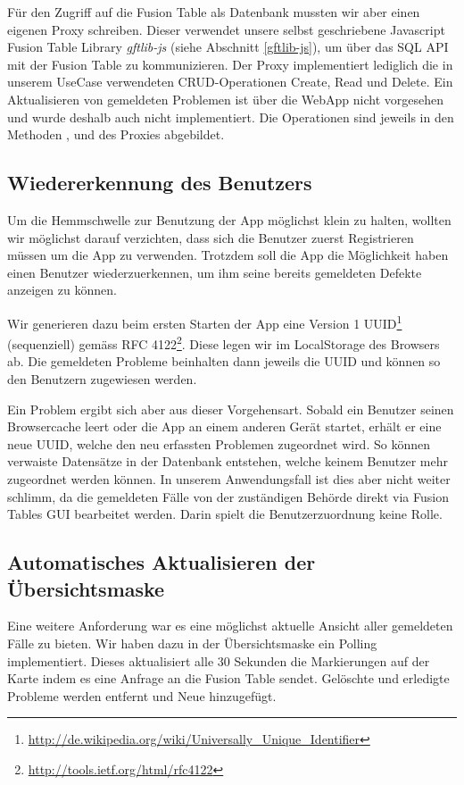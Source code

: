 Für den Zugriff auf die Fusion Table als Datenbank mussten wir aber einen eigenen Proxy schreiben. Dieser verwendet unsere selbst geschriebene Javascript Fusion Table Library \emph{gftlib-js} (siehe Abschnitt \ref{gftlib-js}), um über das SQL API mit der Fusion Table zu kommunizieren.
Der Proxy implementiert lediglich die in unserem UseCase verwendeten CRUD-Operationen Create, Read und Delete. Ein Aktualisieren von gemeldeten Problemen ist über die WebApp nicht vorgesehen und wurde deshalb auch nicht implementiert.
Die Operationen sind jeweils in den Methoden ,  und  des Proxies abgebildet.

\subsection{Wiedererkennung des Benutzers}
\label{fixmystreet-user-detection}
Um die Hemmschwelle zur Benutzung der App möglichst klein zu halten, wollten wir möglichst darauf verzichten, dass sich die Benutzer zuerst Registrieren müssen um die App zu verwenden. Trotzdem soll die App die Möglichkeit haben einen Benutzer wiederzuerkennen, um ihm seine bereits gemeldeten Defekte anzeigen zu können.

Wir generieren dazu beim ersten Starten der App eine Version 1 UUID\footnote{\url{http://de.wikipedia.org/wiki/Universally_Unique_Identifier}} (sequenziell) gemäss RFC 4122\footnote{\url{http://tools.ietf.org/html/rfc4122}}. Diese legen wir im LocalStorage des Browsers ab. Die gemeldeten Probleme beinhalten dann jeweils die UUID und können so den Benutzern zugewiesen werden.

Ein Problem ergibt sich aber aus dieser Vorgehensart. Sobald ein Benutzer seinen Browsercache leert oder die App an einem anderen Gerät startet, erhält er eine neue UUID, welche den neu erfassten Problemen zugeordnet wird. So können verwaiste Datensätze in der Datenbank entstehen, welche keinem Benutzer mehr zugeordnet werden können. In unserem Anwendungsfall ist dies aber nicht weiter schlimm, da die gemeldeten Fälle von der zuständigen Behörde direkt via Fusion Tables GUI bearbeitet werden. Darin spielt die Benutzerzuordnung keine Rolle.

\subsection{Automatisches Aktualisieren der Übersichtsmaske}
\label{fixmystreet-polling}
Eine weitere Anforderung war es eine möglichst aktuelle Ansicht aller gemeldeten Fälle zu bieten. Wir haben dazu in der Übersichtsmaske ein Polling implementiert. Dieses aktualisiert alle 30 Sekunden die Markierungen auf der Karte indem es eine Anfrage an die Fusion Table sendet. Gelöschte und erledigte Probleme werden entfernt und Neue hinzugefügt.


